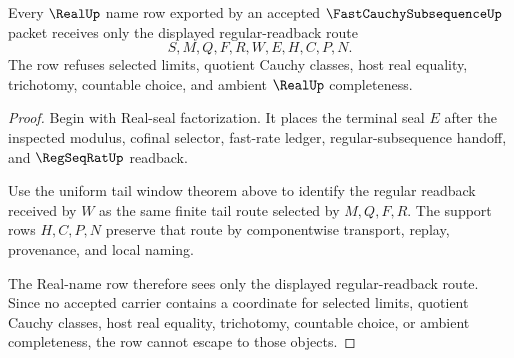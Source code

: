 \begin{theorem}
\label{thm:fast-cauchy-subsequence-real-name-nonescape}
Every $\RealUp$ name row exported by an accepted $\FastCauchySubsequenceUp$ packet receives only the displayed regular-readback route
$$
S,M,Q,F,R,W,E,H,C,P,N .
$$
The row refuses selected limits, quotient Cauchy classes, host real equality, trichotomy, countable choice, and ambient $\RealUp$ completeness.
\end{theorem}
\begin{proof}
Begin with Real-seal factorization. It places the terminal seal $E$ after the inspected modulus, cofinal selector, fast-rate ledger, regular-subsequence handoff, and $\RegSeqRatUp$ readback.

Use the uniform tail window theorem above to identify the regular readback received by $W$ as the same finite tail route selected by $M,Q,F,R$. The support rows $H,C,P,N$ preserve that route by componentwise transport, replay, provenance, and local naming.

The Real-name row therefore sees only the displayed regular-readback route. Since no accepted carrier contains a coordinate for selected limits, quotient Cauchy classes, host real equality, trichotomy, countable choice, or ambient completeness, the row cannot escape to those objects.
\end{proof}

